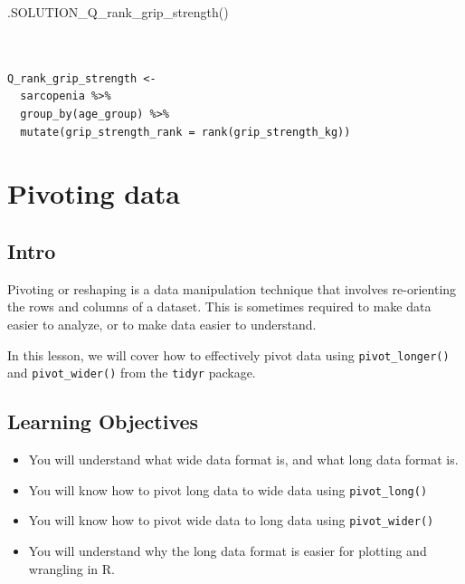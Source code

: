 \documentclass[
  letterpaper,
  DIV=11,
  numbers=noendperiod]{scrreprt}
\newenvironment{Shaded}{\begin{snugshade}}{\end{snugshade}}
\newcommand{\FunctionTok}[1]{\textcolor[rgb]{0.28,0.35,0.67}{#1}}
\newcommand{\NormalTok}[1]{\textcolor[rgb]{0.00,0.23,0.31}{#1}}
\begin{document}
\begin{Shaded}
\begin{Highlighting}[]
\FunctionTok{.SOLUTION\_Q\_rank\_grip\_strength}\NormalTok{()}
\end{Highlighting}
\end{Shaded}

\begin{verbatim}


Q_rank_grip_strength <- 
  sarcopenia %>%
  group_by(age_group) %>%
  mutate(grip_strength_rank = rank(grip_strength_kg))
\end{verbatim}


\hypertarget{pivoting-data}{%
\chapter{Pivoting data}\label{pivoting-data}}

\hypertarget{intro-2}{%
\section{Intro}\label{intro-2}}

Pivoting or reshaping is a data manipulation technique that involves
re-orienting the rows and columns of a dataset. This is sometimes
required to make data easier to analyze, or to make data easier to
understand.

In this lesson, we will cover how to effectively pivot data using
\texttt{pivot\_longer()} and \texttt{pivot\_wider()} from the
\texttt{tidyr} package.

\hypertarget{learning-objectives-12}{%
\section{Learning Objectives}\label{learning-objectives-12}}

\begin{itemize}
\item
  You will understand what wide data format is, and what long data
  format is.
\item
  You will know how to pivot long data to wide data using
  \texttt{pivot\_long()}
\item
  You will know how to pivot wide data to long data using
  \texttt{pivot\_wider()}
\item
  You will understand why the long data format is easier for plotting
  and wrangling in R.
\end{itemize}
\end{document}
